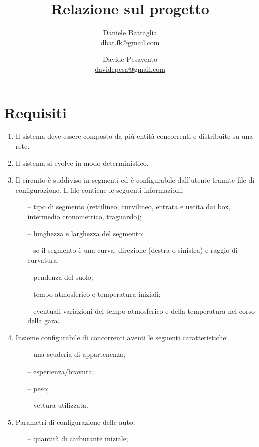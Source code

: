 \documentclass[11pt,a4paper]{report}
\title{Relazione sul progetto}
\author{Daniele Battaglia\\\url{dbat.fk@gmail.com}
	\and Davide Pesavento\\\url{davidepesa@gmail.com}}
\date{}
\begin{document}
\maketitle

\tableofcontents

\clearpage

\chapter{Requisiti}
\begin{enumerate}
    \item Il sistema deve essere composto da più entità concorrenti e distribuite su una rete.
    \item Il sistema si evolve in modo deterministico.
    \item Il circuito è suddiviso in segmenti ed è configurabile dall'utente tramite file di configurazione. Il file contiene le seguenti informazioni:
    \begin{itemize}
        \item[--] tipo di segmento (rettilineo, curvilineo, entrata e uscita dai box, intermedio cronometrico, traguardo);
        \item[--] lunghezza e larghezza del segmento;
        \item[--] se il segmento è una curva, direzione (destra o sinistra) e raggio di curvatura;
        \item[--] pendenza del suolo;
        \item[--] tempo atmosferico e temperatura iniziali;
        \item[--] eventuali variazioni del tempo atmosferico e della temperatura nel corso della gara.
    \end{itemize}
    \item Insieme configurabile di concorrenti aventi le seguenti caratteristiche:
    \begin{itemize}
        \item[--] una scuderia di appartenenza;
        \item[--] esperienza/bravura;
        \item[--] peso;
        \item[--] vettura utilizzata.
    \end{itemize}
    \item Parametri di configurazione delle auto:
    \begin{itemize}
        \item[--] quantità di carburante iniziale;

\end{itemize}
\end{enumerate}
\end{document}
